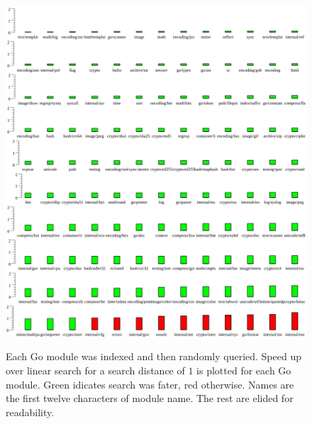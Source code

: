 \begin{figure}
    \includegraphics[width=\textwidth]{example1.png}
    \label{dist1plot}
    \centering
    \caption{Each Go module was indexed and then randomly queried.
    Speed up over linear search for a search distance of $1$ is plotted for each Go module.
    Green idicates search was fater, red otherwise.
    Names are the first twelve characters of module name.
    The rest are elided for readability.}
\end{figure}
